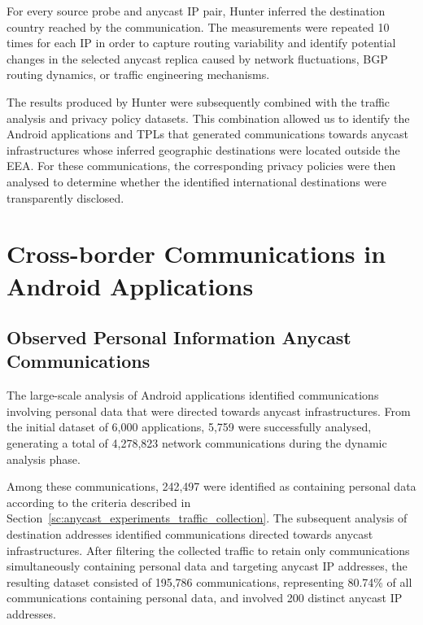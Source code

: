 For every source probe and anycast IP pair, Hunter inferred the destination country reached by the communication. The measurements were repeated 10 times for each IP in order to capture routing variability and identify potential changes in the selected anycast replica caused by network fluctuations, BGP routing dynamics, or traffic engineering mechanisms. 

The results produced by Hunter were subsequently combined with the traffic analysis and privacy policy datasets. This combination allowed us to identify the Android applications and TPLs that generated communications towards anycast infrastructures whose inferred geographic destinations were located outside the EEA. For these communications, the corresponding privacy policies were then analysed to determine whether the identified international destinations were transparently disclosed.

\section{Cross-border Communications in Android Applications}
\label{sc:anycast_experiments_cross_border}

\subsection{Observed Personal Information Anycast Communications}
\label{sc:anycast_experiments_observed_pii_anycast_communications}

The large-scale analysis of Android applications identified communications involving personal data that were directed towards anycast infrastructures. From the initial dataset of 6,000 applications, 5,759 were successfully analysed, generating a total of 4,278,823 network communications during the dynamic analysis phase.

Among these communications, 242,497 were identified as containing personal data according to the criteria described in Section~\ref{sc:anycast_experiments_traffic_collection}. The subsequent analysis of destination addresses identified communications directed towards anycast infrastructures. After filtering the collected traffic to retain only communications simultaneously containing personal data and targeting anycast IP addresses, the resulting dataset consisted of 195,786 communications, representing 80.74\% of all communications containing personal data, and involved 200 distinct anycast IP addresses.

